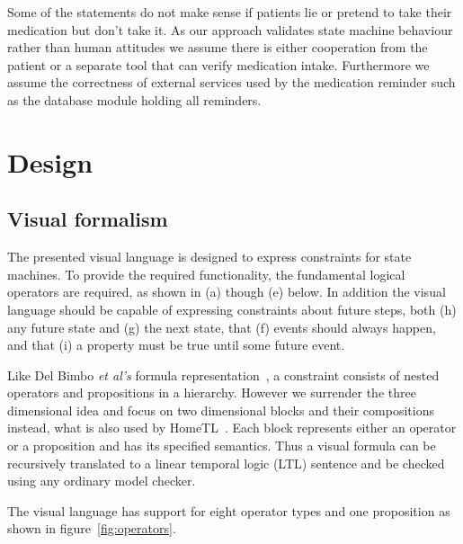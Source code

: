 \documentclass[conference]{IEEEtran}
\begin{document}
Some of the statements do not make sense if patients lie or pretend to take their medication but don't take it. As our approach validates state machine behaviour rather than human attitudes we assume there is either cooperation from the patient or a separate tool that can verify medication intake. Furthermore we assume the correctness of external services used by the medication reminder such as the database module holding all reminders.



\section{Design}

\subsection{Visual formalism}
\label{sec:visualformalism}

The presented visual language is designed to express constraints for state machines. To provide the required functionality, the fundamental logical operators are required, as shown in (a) though (e) below. In addition the visual language should be capable of expressing constraints about future steps, both (h) any future state and (g) the next state, that (f) events should always happen, and that (i) a property must be true until some future event.

 Like Del Bimbo {\em et al's} formula representation~\cite{520786}, a constraint consists of nested operators and propositions in a hierarchy. However we surrender the three dimensional idea and focus on two dimensional blocks and their compositions instead, what is also used by HomeTL~\cite{4341725}.
Each block represents either an operator or a proposition and has its specified semantics. Thus a visual formula can be recursively translated to a linear temporal logic (LTL) sentence and be checked using any ordinary model checker. 

The visual language has support for eight operator types and one proposition as shown in figure~\ref{fig:operators}. 
\end{document}
